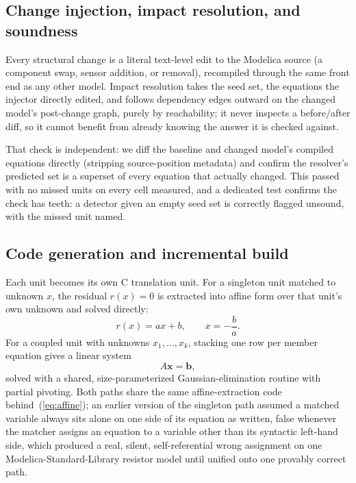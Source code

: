 \documentclass[journal]{IEEEtran}
\begin{document}
\subsection{Change injection, impact resolution, and soundness}

Every structural change is a literal text-level edit to the Modelica source (a component swap, sensor addition, or removal), recompiled through the same front end as any other model. Impact resolution takes the seed set, the equations the injector directly edited, and follows dependency edges outward on the changed model's post-change graph, purely by reachability; it never inspects a before/after diff, so it cannot benefit from already knowing the answer it is checked against.

That check is independent: we diff the baseline and changed model's compiled equations directly (stripping source-position metadata) and confirm the resolver's predicted set is a superset of every equation that actually changed. This passed with no missed units on every cell measured, and a dedicated test confirms the check has teeth: a detector given an empty seed set is correctly flagged unsound, with the missed unit named.

\subsection{Code generation and incremental build}

Each unit becomes its own C translation unit. For a singleton unit matched to unknown $x$, the residual $r(x)=0$ is extracted into affine form over that unit's own unknown and solved directly:
\begin{equation}
r(x) = ax + b, \qquad x = -\frac{b}{a}.
\label{eq:affine}
\end{equation}
For a coupled unit with unknowns $x_1,\dots,x_k$, stacking one row per member equation gives a linear system
\begin{equation}
A\mathbf{x} = \mathbf{b},
\label{eq:linsys}
\end{equation}
solved with a shared, size-parameterized Gaussian-elimination routine with partial pivoting. Both paths share the same affine-extraction code behind~(\ref{eq:affine}); an earlier version of the singleton path assumed a matched variable always sits alone on one side of its equation as written, false whenever the matcher assigns an equation to a variable other than its syntactic left-hand side, which produced a real, silent, self-referential wrong assignment on one Modelica-Standard-Library resistor model until unified onto one provably correct path.
\end{document}
